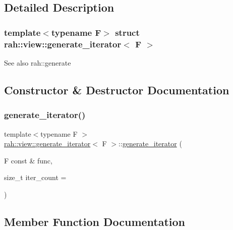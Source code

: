 \subsection{Detailed Description}
\subsubsection*{template$<$typename F$>$\newline
struct rah\+::view\+::generate\+\_\+iterator$<$ F $>$}

\begin{DoxySeeAlso}{See also}
rah\+::generate 
\end{DoxySeeAlso}


\subsection{Constructor \& Destructor Documentation}
\mbox{\label{structrah_1_1view_1_1generate__iterator_af458a280a6089691435a8ad71380fca9}} 
\subsubsection{\texorpdfstring{generate\_iterator()}{generate\_iterator()}}
{\footnotesize\ttfamily template$<$typename F $>$ \\
\mbox{\hyperlink{structrah_1_1view_1_1generate__iterator}{rah\+::view\+::generate\+\_\+iterator}}$<$ F $>$\+::\mbox{\hyperlink{structrah_1_1view_1_1generate__iterator}{generate\+\_\+iterator}} (\begin{DoxyParamCaption}\item[{F const \&}]{func,  }\item[{size\+\_\+t}]{iter\+\_\+count = {} }\end{DoxyParamCaption})\hspace{0.3cm}{\ttfamily [inline]}}



\subsection{Member Function Documentation}
\mbox{\label{structrah_1_1view_1_1generate__iterator_ab7b0cf4a8f45cfd67278935bd9a39c13}} 
